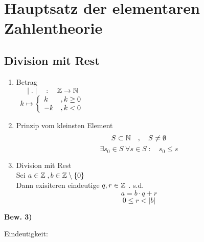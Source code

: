\chapter{Hauptsatz der elementaren Zahlentheorie}

\section{Division mit Rest}

\begin{enumerate}[\bfseries 1)]

\item Betrag\\
$
\begin{array}{c}
|\; .\; | \quad : \quad \mathbb{Z} \rightarrow \mathbb{N} \\
k\mapsto \left\{ \begin{array}{lr} k &,k\geq 0 \\ -k &, k<0 \end{array}\right.
\end{array}
$

\item Prinzip vom kleinsten Element\\

$$S \subset \mathbb{N} \quad , \quad S \not= \emptyset$$
$$ \exists s_0 \in S \; \forall s\in S\; : \quad s_0 \leq s$$

\item Division mit Rest\\
Sei $a \in \mathbb{Z} \;, b \in \mathbb{Z} \setminus \{ 0 \}$\\
Dann exisiteren eindeutige $q,r \in \mathbb{Z}$ . s.d. 
$$a= b\cdot q + r$$
$$0 \leq r < |b|$$

\end{enumerate}

\begin{description}

\item{\bfseries Bew. 3)}

\begin{description}

\item{Eindeutigkeit:}\\

\end{description}

\end{description}